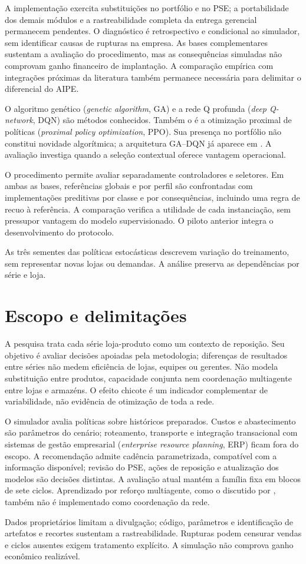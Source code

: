 A implementação exercita substituições no portfólio e no PSE; a portabilidade dos demais módulos e a rastreabilidade completa da entrega gerencial permanecem pendentes. O diagnóstico é retrospectivo e condicional ao simulador, sem identificar causas de rupturas na empresa. As bases complementares sustentam a avaliação do procedimento, mas as consequências simuladas não comprovam ganho financeiro de implantação. A comparação empírica com integrações próximas da literatura também permanece necessária para delimitar o diferencial do AIPE.

O algoritmo genético (\textit{genetic algorithm}, GA) e a rede Q profunda (\textit{deep Q-network}, DQN) são métodos conhecidos. Também o é a otimização proximal de políticas (\textit{proximal policy optimization}, PPO). Sua presença no portfólio não constitui novidade algorítmica; a arquitetura GA--DQN já aparece em \citet{Zabraoui2025GaDQN}. A avaliação investiga quando a seleção contextual oferece vantagem operacional.

O procedimento permite avaliar separadamente controladores e seletores. Em ambas as bases, referências globais e por perfil são confrontadas com implementações preditivas por classe e por consequências, incluindo uma regra de recuo à referência. A comparação verifica a utilidade de cada instanciação, sem pressupor vantagem do modelo supervisionado. O piloto anterior integra o desenvolvimento do protocolo.

As três sementes das políticas estocásticas descrevem variação do treinamento, sem representar novas lojas ou demandas. A análise preserva as dependências por série e loja.

\section{Escopo e delimitações}
\label{sec:delimitacoes}

A pesquisa trata cada série loja-produto como um contexto de reposição. Seu objetivo é avaliar decisões apoiadas pela metodologia; diferenças de resultados entre séries não medem eficiência de lojas, equipes ou gerentes. Não modela substituição entre produtos, capacidade conjunta nem coordenação multiagente entre lojas e armazéns. O efeito chicote é um indicador complementar de variabilidade, não evidência de otimização de toda a rede.

O simulador avalia políticas sobre históricos preparados. Custos e abastecimento são parâmetros do cenário; roteamento, transporte e integração transacional com sistemas de gestão empresarial (\textit{enterprise resource planning}, ERP) ficam fora do escopo. A recomendação admite cadência parametrizada, compatível com a informação disponível; revisão do PSE, ações de reposição e atualização dos modelos são decisões distintas. A avaliação atual mantém a família fixa em blocos de sete ciclos. Aprendizado por reforço multiagente, como o discutido por \citet{Liu2024HAPPO}, também não é implementado como coordenação da rede.

Dados proprietários limitam a divulgação; código, parâmetros e identificação de artefatos e recortes sustentam a rastreabilidade. Rupturas podem censurar vendas e ciclos ausentes exigem tratamento explícito. A simulação não comprova ganho econômico realizável.

\newpage\lhead{\rightmark}
